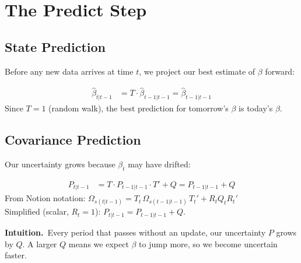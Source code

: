 \documentclass[10pt,a4paper,twocolumn]{article}
\begin{document}
\section{The Predict Step}

\subsection{State Prediction}

Before any new data arrives at time $t$, we project our best estimate
of $\beta$ forward:

\begin{tcolorbox}[mathbox={Formula 1 --- State Prediction}]
\vspace{-4pt}
\begin{align}
  \hat\beta_{t|t-1} &= T \cdot \hat\beta_{t-1|t-1} = \hat\beta_{t-1|t-1}
  \label{eq:state_pred}
\end{align}
\vspace{-4pt}
Since $T=1$ (random walk), the best prediction for tomorrow's
$\beta$ is today's $\beta$.
\end{tcolorbox}

\subsection{Covariance Prediction}

Our uncertainty grows because $\beta_t$ may have drifted:
\begin{tcolorbox}[mathbox={Formula 2 --- Covariance Prediction}]
\vspace{-4pt}
\begin{align}
  P_{t|t-1} &= T\cdot P_{t-1|t-1}\cdot T' + Q
             = P_{t-1|t-1} + Q \label{eq:cov_pred}
\end{align}
\vspace{-4pt}
From Notion notation: $\Omega_{s(t|t-1)} = T_t\,\Omega_{s(t-1|t-1)}\,T_t' + R_t Q_t R_t'$\\
Simplified (scalar, $R_t=1$): $P_{t|t-1} = P_{t-1|t-1} + Q$.
\end{tcolorbox}

\noindent\textbf{Intuition.}~Every period that passes without an update,
our uncertainty $P$ grows by $Q$.  A larger $Q$ means we expect $\beta$
to jump more, so we become uncertain faster.

\end{document}
